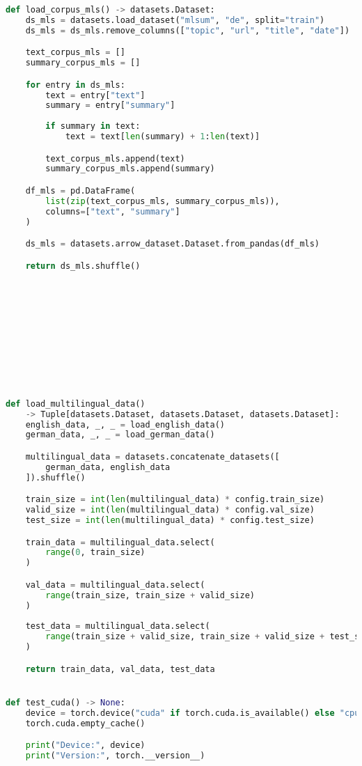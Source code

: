 \begin{lstlisting}[language=Python, caption=Hilfsmethoden]
def load_corpus_mls() -> datasets.Dataset:
    ds_mls = datasets.load_dataset("mlsum", "de", split="train")
    ds_mls = ds_mls.remove_columns(["topic", "url", "title", "date"])

    text_corpus_mls = []
    summary_corpus_mls = []

    for entry in ds_mls:
        text = entry["text"]
        summary = entry["summary"]
        
        if summary in text:
            text = text[len(summary) + 1:len(text)]

        text_corpus_mls.append(text)
        summary_corpus_mls.append(summary)

    df_mls = pd.DataFrame(
        list(zip(text_corpus_mls, summary_corpus_mls)),
        columns=["text", "summary"]
    )

    ds_mls = datasets.arrow_dataset.Dataset.from_pandas(df_mls)

    return ds_mls.shuffle()











def load_multilingual_data()
	-> Tuple[datasets.Dataset, datasets.Dataset, datasets.Dataset]:
    english_data, _, _ = load_english_data()
    german_data, _, _ = load_german_data()

    multilingual_data = datasets.concatenate_datasets([
        german_data, english_data
    ]).shuffle()

    train_size = int(len(multilingual_data) * config.train_size)
    valid_size = int(len(multilingual_data) * config.val_size)
    test_size = int(len(multilingual_data) * config.test_size)

    train_data = multilingual_data.select(
        range(0, train_size)
    )

    val_data = multilingual_data.select(
        range(train_size, train_size + valid_size)
    )
    
    test_data = multilingual_data.select(
        range(train_size + valid_size, train_size + valid_size + test_size)
    )

    return train_data, val_data, test_data


def test_cuda() -> None:
    device = torch.device("cuda" if torch.cuda.is_available() else "cpu")
    torch.cuda.empty_cache()

    print("Device:", device)
    print("Version:", torch.__version__)



\end{lstlisting}
